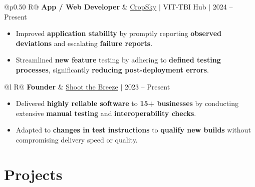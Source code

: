 \documentclass[a4paper,10pt]{article}
\newcommand{\ulink}[2]{\href{#1}{\uline{#2}}}
\newcommand{\subheading}[1]{{\color[HTML]{0A0A0A}\fontsize{12}{14}\selectfont\bfseries #1}}
\newcommand{\meta}[1]{{\color[HTML]{5C5C5C}\fontsize{10.5}{12.5}\selectfont #1}}
\begin{document}
\begin{tabularx}{\linewidth}{@{}p{0.50\linewidth} R@{}}
\subheading{App / Web Developer} & \meta{\ulink{https://sites.google.com/view/cropsky/home}{CropSky} $|$ VIT-TBI Hub $|$ 2024 -- Present}
\end{tabularx}
\begin{itemize}[nosep, leftmargin=1.5em, itemsep=1pt, topsep=2pt]
  \item {\color[HTML]{0A0A0A}\fontsize{11}{14}\selectfont Improved \textbf{application stability} by promptly reporting \textbf{observed deviations} and escalating \textbf{failure reports}.}
  \item {\color[HTML]{0A0A0A}\fontsize{11}{14}\selectfont Streamlined \textbf{new feature} testing by adhering to \textbf{defined testing processes}, significantly \textbf{reducing post-deployment errors}.}
\end{itemize}

\vspace{1pt}

\begin{tabularx}{\linewidth}{@{}l R@{}}
\subheading{Founder} & \meta{\ulink{https://shoot-the-breeze.vercel.app}{Shoot the Breeze} $|$ 2023 -- Present}
\end{tabularx}
\begin{itemize}[nosep, leftmargin=1.5em, itemsep=1pt, topsep=2pt]
  \item {\color[HTML]{0A0A0A}\fontsize{11}{14}\selectfont Delivered \textbf{highly reliable software} to \textbf{15+ businesses} by conducting extensive \textbf{manual testing} and \textbf{interoperability checks}.}
  \item {\color[HTML]{0A0A0A}\fontsize{11}{14}\selectfont Adapted to \textbf{changes in test instructions} to \textbf{qualify new builds} without compromising delivery speed or quality.}
\end{itemize}

\vspace{1pt}

\section{Projects}
\vspace{1pt}
\end{document}
